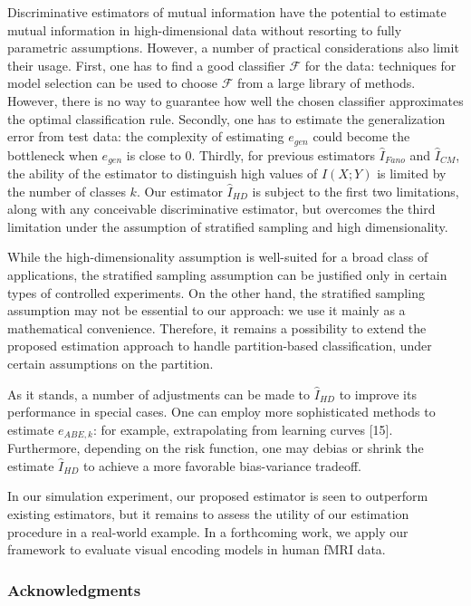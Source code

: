 \documentclass{article}
\begin{document}
Discriminative estimators of mutual information have the potential to
estimate mutual information in high-dimensional data without resorting
to fully parametric assumptions.  However, a number of practical
considerations also limit their usage.  First, one has to find a good
classifier $\mathcal{F}$ for the data: techniques for model selection
can be used to choose $\mathcal{F}$ from a large library of methods.
However, there is no way to guarantee how well the chosen classifier
approximates the optimal classification rule.  Secondly, one has to
estimate the generalization error from test data: the complexity of
estimating $e_{gen}$ could become the bottleneck when $e_{gen}$ is
close to 0.  Thirdly, for previous estimators $\hat{I}_{Fano}$ and
$\hat{I}_{CM}$, the ability of the estimator to distinguish high
values of $I(X; Y)$ is limited by the number of classes $k$.  Our
estimator $\hat{I}_{HD}$ is subject to the first two limitations,
along with any conceivable discriminative estimator, but overcomes the
third limitation under the assumption of stratified sampling and high
dimensionality.

While the high-dimensionality assumption is well-suited for a broad
class of applications, the stratified sampling assumption can be
justified only in certain types of controlled experiments.  On the
other hand, the stratified sampling assumption may not be essential to
our approach: we use it mainly as a mathematical convenience.
Therefore, it remains a possibility to extend the proposed estimation
approach to handle partition-based classification, under certain
assumptions on the partition.

As it stands, a number of adjustments can be made to $\hat{I}_{HD}$ to
improve its performance in special cases.  One can employ more
sophisticated methods to estimate $e_{ABE, k}$: for example,
extrapolating from learning curves [15].  Furthermore,
depending on the risk function, one may debias or shrink the estimate
$\hat{I}_{HD}$ to achieve a more favorable bias-variance tradeoff.

In our simulation experiment, our proposed estimator is seen to
outperform existing estimators, but it remains to assess the utility
of our estimation procedure in a real-world example.  In a forthcoming
work, we apply our framework to evaluate visual encoding models in
human fMRI data.


\subsubsection*{Acknowledgments}
\end{document}
